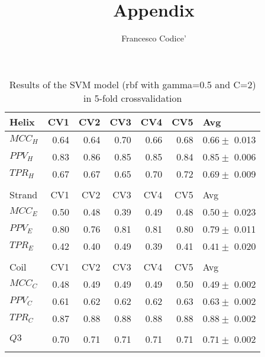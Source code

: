 \documentclass[11pt]{article}
\author{Francesco Codice' }
\date{}
\title{Appendix}
\begin{document}
\maketitle
\begin{table}[htbp]
\caption{Results of the SVM model (rbf with gamma=0.5 and C=2) in 5-fold crossvalidation}
\centering
\begin{tabular}{lrrrrrl}
Helix & CV1 & CV2 & CV3 & CV4 & CV5 & Avg\\
\hline
\(MCC_H\) & 0.64 & 0.64 & 0.70 & 0.66 & 0.68 & \(0.66 \pm\) 0.013\\
\(PPV_H\) & 0.83 & 0.86 & 0.85 & 0.85 & 0.84 & \(0.85 \pm\) 0.006\\
\(TPR_H\) & 0.67 & 0.67 & 0.65 & 0.70 & 0.72 & \(0.69 \pm\) 0.009\\
 &  &  &  &  &  & \\
Strand & CV1 & CV2 & CV3 & CV4 & CV5 & Avg\\
\hline
\(MCC_E\) & 0.50 & 0.48 & 0.39 & 0.49 & 0.48 & \(0.50 \pm\) 0.023\\
\(PPV_E\) & 0.80 & 0.76 & 0.81 & 0.81 & 0.80 & \(0.79 \pm\) 0.011\\
\(TPR_E\) & 0.42 & 0.40 & 0.49 & 0.39 & 0.41 & \(0.41 \pm\) 0.020\\
 &  &  &  &  &  & \\
Coil & CV1 & CV2 & CV3 & CV4 & CV5 & Avg\\
\hline
\(MCC_C\) & 0.48 & 0.49 & 0.49 & 0.49 & 0.50 & \(0.49 \pm\) 0.002\\
\(PPV_C\) & 0.61 & 0.62 & 0.62 & 0.62 & 0.63 & \(0.63 \pm\) 0.002\\
\(TPR_C\) & 0.87 & 0.88 & 0.88 & 0.88 & 0.88 & \(0.88 \pm\) 0.002\\
 &  &  &  &  &  & \\
\hline
\(Q3\) & 0.70 & 0.71 & 0.71 & 0.71 & 0.71 & \(0.71 \pm\) 0.002\\
 &  &  &  &  &  & \\
\end{tabular}
\end{table}
\end{document}
